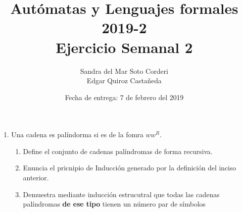 \documentclass{article}
\begin{document}
    
    \title{Autómatas y Lenguajes formales 2019-2\\
    \large Ejercicio Semanal 2}

    \date{Fecha de entrega: 7 de febrero del 2019}

    \author{Sandra del Mar Soto Corderi\\
    Edgar Quiroz Castañeda}

    \maketitle


    \begin{enumerate}
        \item {
            Una cadena es palíndorma si es de la fomra $ww^R$.
            \begin{enumerate}
                \item {
                    Define el conjunto de cadenas palíndromas de forma recursiva.
                }
                \item {
                    Enuncia el pricnipio de Inducción generado por la definición
                    del inciso anterior.
                }
                \item {
                    Demuestra mediante inducción estrucutral que todas las 
                    cadenas palíndromas \textbf{de ese tipo} tienen un número 
                    par de símbolos
                }
                

\end{enumerate}}
\end{enumerate}
\end{document}
